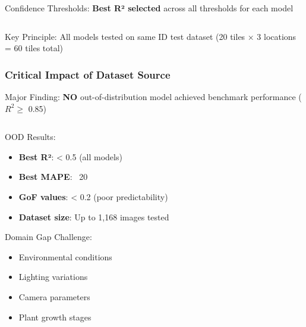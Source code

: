 \documentclass[aspectratio=43]{beamer}
\begin{document}
\begin{frame}
\begin{columns}
\begin{column}{0.4\textwidth}
\begin{exampleblock}{Confidence Thresholds:}
                \vspace{0.3cm}
                \textbf{Best R² selected} across all thresholds for each model
            \end{exampleblock}
        \end{column}
    \end{columns}
    
    \begin{alertblock}{Key Principle:}
        \small All models tested on same ID test dataset (20 tiles × 3 locations = 60 tiles total)
    \end{alertblock}
\end{frame}

\begin{frame}
    \frametitle{Critical Impact of Dataset Source}
    
    \begin{alertblock}{Major Finding:}
        \large \textbf{NO} out-of-distribution model achieved benchmark performance ($R^2 \geq$ 0.85)
    \end{alertblock}
    
    \begin{columns}
        \begin{column}{0.5\textwidth}
            \begin{block}{OOD Results:}
                \small
                \begin{itemize}
                    \item \textbf{Best R²}: < 0.5 (all models)
                    \item \textbf{Best MAPE}: ~20%
                    \item \textbf{GoF values}: < 0.2 (poor predictability)
                    \item \textbf{Dataset size}: Up to 1,168 images tested
                \end{itemize}
            \end{block}
            
            \begin{alertblock}{Domain Gap Challenge:}
                \small
                \begin{itemize}
                    \item Environmental conditions
                    \item Lighting variations
                    \item Camera parameters
                    \item Plant growth stages
                \end{itemize}
            \end{alertblock}
        \end{column}
        

\end{columns}
\end{frame}
\end{document}

